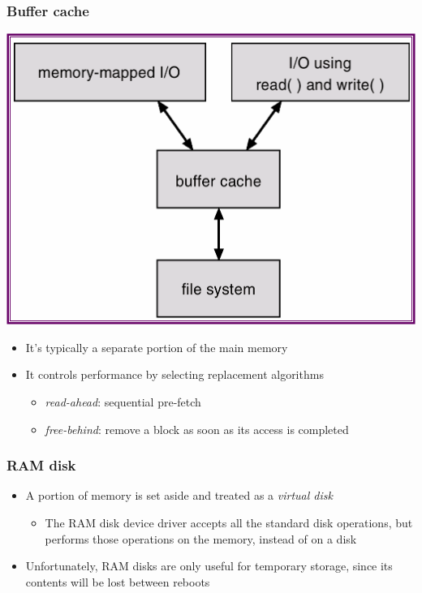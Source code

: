 \documentclass[CJKutf8,xcolor=pdftex,dvipsnames,table]{beamer}
\begin{document}
\begin{CJK*}{UTF8}{song}
  \begin{frame}
    \frametitle{Buffer cache} \pause
    \begin{center}
      \includegraphics[scale=.4]{v6f12-12} \pause
    \end{center}
    \begin{itemize}\parskip=0pt
    \item It's typically a separate portion of the main memory \pause
    \item It controls performance by selecting replacement algorithms \pause
      \begin{itemize}\parskip=0pt
      \item \emph{read-ahead}: sequential pre-fetch \pause
      \item \emph{free-behind}: remove a block as soon as its access is completed
      \end{itemize}
    \end{itemize}
  \end{frame}
  
  \begin{frame}
    \frametitle{RAM disk} \pause
    \begin{itemize}\parskip=0pt
    \item A portion of memory is set aside and treated as a \emph{virtual disk} \pause
      \begin{itemize}\parskip=0pt
      \item The RAM disk device driver accepts all the standard disk operations, but performs those operations on the memory, instead of on a disk \pause
      \end{itemize}
    \item Unfortunately, RAM disks are only useful for temporary storage, since its contents will be lost between reboots
    \end{itemize}
  \end{frame}
  

\end{CJK*}
\end{document}

